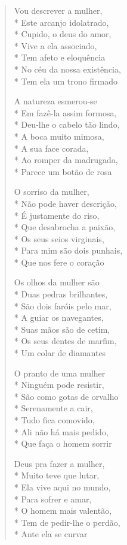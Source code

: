 \begin{verse}

Vou descrever a mulher,\\*
Este arcanjo idolatrado,\\*
Cupido, o deus do amor,\\*
Vive a ela associado,\\*
Tem afeto e eloquência\\*
No céu da nossa existência,\\*
Tem ela um trono firmado

A natureza esmerou-se\\*
Em fazê-la assim formosa,\\*
Deu-lhe o cabelo tão lindo,\\*
A boca muito mimosa,\\*
A sua face corada,\\*
Ao romper da madrugada,\\*
Parece um botão de rosa

O sorriso da mulher,\\*
Não pode haver descrição,\\*
É justamente do riso,\\*
Que desabrocha a paixão,\\*
Os seus seios virginais,\\*
Para mim são dois punhais,\\*
Que nos fere o coração

Os olhos da mulher são\\*
Duas pedras brilhantes,\\*
São dois faróis pelo mar,\\*
A guiar os navegantes,\\*
Suas mãos são de cetim,\\*
Os seus dentes de marfim,\\*
Um colar de diamantes

O pranto de uma mulher\\*
Ninguém pode resistir,\\*
São como gotas de orvalho\\*
Serenamente a cair,\\*
Tudo fica comovido,\\*
Ali não há mais pedido,\\*
Que faça o homem sorrir

Deus pra fazer a mulher,\\*
Muito teve que lutar,\\*
Ela vive aqui no mundo,\\*
Para sofrer e amar,\\*
O homem mais valentão,\\*
Tem de pedir-lhe o perdão,\\*
Ante ela se curvar


\end{verse}

